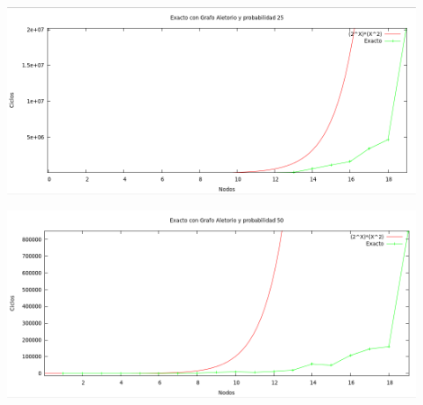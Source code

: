 \begin {center}
\includegraphics[width=12cm]{./graficos/exacto-proba-25.png}
\end {center}
 
\begin {center}
\includegraphics[width=12cm]{./graficos/exacto-proba-50.png}
\end {center} 
